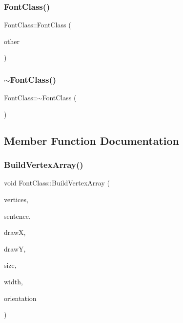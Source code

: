 \mbox{\label{class_font_class_a5c384c68e547994bd92c47f5427b341b}} 
\subsubsection{\texorpdfstring{Font\+Class()}{FontClass()}\hspace{0.1cm}{\footnotesize\ttfamily [2/2]}}
{\footnotesize\ttfamily Font\+Class\+::\+Font\+Class (\begin{DoxyParamCaption}\item[{const \hyperlink{class_font_class}{Font\+Class} \&}]{other }\end{DoxyParamCaption})}

\mbox{\label{class_font_class_a594bef7039855b7db30d92699b6ec975}} 
\subsubsection{\texorpdfstring{$\sim$\+Font\+Class()}{~FontClass()}}
{\footnotesize\ttfamily Font\+Class\+::$\sim$\+Font\+Class (\begin{DoxyParamCaption}{ }\end{DoxyParamCaption})}



\subsection{Member Function Documentation}
\mbox{\label{class_font_class_a8012fb1b59ee4c3e2b3e59b97daf8c5a}} 
\subsubsection{\texorpdfstring{Build\+Vertex\+Array()}{BuildVertexArray()}}
{\footnotesize\ttfamily void Font\+Class\+::\+Build\+Vertex\+Array (\begin{DoxyParamCaption}\item[{void $\ast$}]{vertices,  }\item[{const std\+::wstring \&}]{sentence,  }\item[{float}]{drawX,  }\item[{float}]{drawY,  }\item[{float}]{size,  }\item[{float}]{width,  }\item[{\hyperlink{class_font_class_a66bce9a04891356d0db3e0115ea6971a}{orient}}]{orientation }\end{DoxyParamCaption})}

